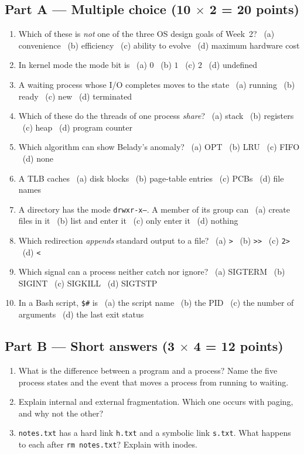 \documentclass[11pt,a4paper]{article}
\newcommand{\cmd}[1]{\texttt{#1}}
\begin{document}
\subsection*{Part A --- Multiple choice (10 $\times$ 2 = 20 points)}
\begin{enumerate}[leftmargin=1.6em,label=A\arabic*.]
  \item Which of these is \emph{not} one of the three OS design goals of Week~2? \ (a) convenience \ (b) efficiency \ (c) ability to evolve \ (d) maximum hardware cost
  \item In kernel mode the mode bit is \ (a) $0$ \ (b) $1$ \ (c) $2$ \ (d) undefined
  \item A waiting process whose I/O completes moves to the state \ (a) running \ (b) ready \ (c) new \ (d) terminated
  \item Which of these do the threads of one process \emph{share}? \ (a) stack \ (b) registers \ (c) heap \ (d) program counter
  \item Which algorithm can show Belady's anomaly? \ (a) OPT \ (b) LRU \ (c) FIFO \ (d) none
  \item A TLB caches \ (a) disk blocks \ (b) page-table entries \ (c) PCBs \ (d) file names
  \item A directory has the mode \texttt{drwxr-x---}. A member of its group can \ (a) create files in it \ (b) list and enter it \ (c) only enter it \ (d) nothing
  \item Which redirection \emph{appends} standard output to a file? \ (a) \texttt{>} \ (b) \texttt{>>} \ (c) \texttt{2>} \ (d) \texttt{<}
  \item Which signal can a process neither catch nor ignore? \ (a) SIGTERM \ (b) SIGINT \ (c) SIGKILL \ (d) SIGTSTP
  \item In a Bash script, \texttt{\$\#} is \ (a) the script name \ (b) the PID \ (c) the number of arguments \ (d) the last exit status
\end{enumerate}

\subsection*{Part B --- Short answers (3 $\times$ 4 = 12 points)}
\begin{enumerate}[leftmargin=1.6em,label=B\arabic*.]
  \item What is the difference between a program and a process? Name the five process states and the event that moves a process from running to waiting. 
  \item Explain internal and external fragmentation. Which one occurs with paging, and why not the other? 
  \item \texttt{notes.txt} has a hard link \texttt{h.txt} and a symbolic link \texttt{s.txt}. What happens to each after \cmd{rm notes.txt}? Explain with inodes. 
\end{enumerate}
\end{document}

